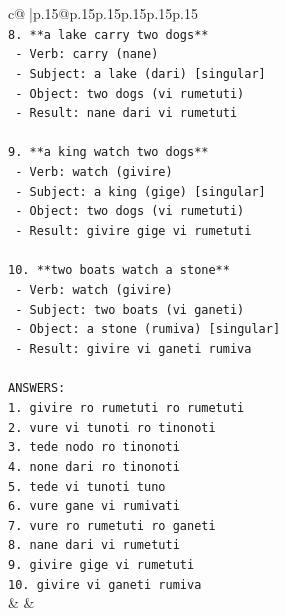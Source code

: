 \documentclass{article}
\begin{document}
{\begin{supertabular}{c@{$\;$}|p{.15\linewidth}@{}p{.15\linewidth}p{.15\linewidth}p{.15\linewidth}p{.15\linewidth}p{.15\linewidth}}
{{{\\ 
\texttt{8. **a lake carry two dogs**} \\
\texttt{   {-} Verb: carry (nane)} \\
\texttt{   {-} Subject: a lake (dari) {[}singular{]}} \\
\texttt{   {-} Object: two dogs (vi rumetuti)} \\
\texttt{   {-} Result: nane dari vi rumetuti} \\
\\ 
\texttt{9. **a king watch two dogs**} \\
\texttt{   {-} Verb: watch (givire)} \\
\texttt{   {-} Subject: a king (gige) {[}singular{]}} \\
\texttt{   {-} Object: two dogs (vi rumetuti)} \\
\texttt{   {-} Result: givire gige vi rumetuti} \\
\\ 
\texttt{10. **two boats watch a stone**} \\
\texttt{    {-} Verb: watch (givire)} \\
\texttt{    {-} Subject: two boats (vi ganeti)} \\
\texttt{    {-} Object: a stone (rumiva) {[}singular{]}} \\
\texttt{    {-} Result: givire vi ganeti rumiva} \\
\\ 
\texttt{ANSWERS:} \\
\texttt{1. givire ro rumetuti ro rumetuti} \\
\texttt{2. vure vi tunoti ro tinonoti} \\
\texttt{3. tede nodo ro tinonoti} \\
\texttt{4. none dari ro tinonoti} \\
\texttt{5. tede vi tunoti tuno} \\
\texttt{6. vure gane vi rumivati} \\
\texttt{7. vure ro rumetuti ro ganeti} \\
\texttt{8. nane dari vi rumetuti} \\
\texttt{9. givire gige vi rumetuti} \\
\texttt{10. givire vi ganeti rumiva} \\
            }
        }
    }
    & & \\ \\


\end{supertabular}}
\end{document}

